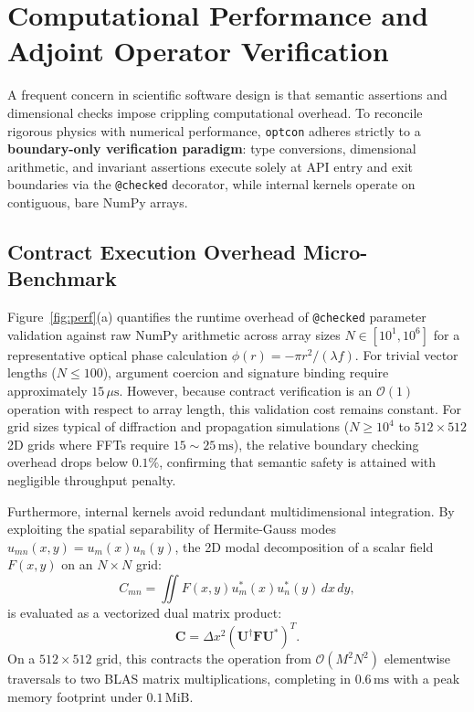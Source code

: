 \documentclass[preprint,12pt]{elsarticle}
\begin{document}
\section{Computational Performance and Adjoint Operator Verification}
\label{sec:performance}

A frequent concern in scientific software design is that semantic assertions and dimensional checks impose crippling computational overhead. To reconcile rigorous physics with numerical performance, \texttt{optcon} adheres strictly to a \textbf{boundary-only verification paradigm}: type conversions, dimensional arithmetic, and invariant assertions execute solely at API entry and exit boundaries via the \texttt{@checked} decorator, while internal kernels operate on contiguous, bare NumPy arrays.

\subsection{Contract Execution Overhead Micro-Benchmark}

Figure~\ref{fig:perf}(a) quantifies the runtime overhead of \texttt{@checked} parameter validation against raw NumPy arithmetic across array sizes $N \in [10^1, 10^6]$ for a representative optical phase calculation $\phi(r) = -\pi r^2 / (\lambda f)$. For trivial vector lengths ($N \le 100$), argument coercion and signature binding require approximately $15\,\mu\mathrm{s}$. However, because contract verification is an $\mathcal{O}(1)$ operation with respect to array length, this validation cost remains constant. For grid sizes typical of diffraction and propagation simulations ($N \ge 10^4$ to $512 \times 512$ 2D grids where FFTs require $15\sim 25\,\mathrm{ms}$), the relative boundary checking overhead drops below $0.1\%$, confirming that semantic safety is attained with negligible throughput penalty.

Furthermore, internal kernels avoid redundant multidimensional integration. By exploiting the spatial separability of Hermite-Gauss modes $u_{mn}(x, y) = u_m(x) u_n(y)$, the 2D modal decomposition of a scalar field $F(x, y)$ on an $N \times N$ grid:
\begin{equation}
C_{mn} = \iint F(x, y) u_m^*(x) u_n^*(y) \, dx \, dy,
\end{equation}
is evaluated as a vectorized dual matrix product:
\begin{equation}
\mathbf{C} = \Delta x^2 \left( \mathbf{U}^\dagger \mathbf{F} \mathbf{U}^* \right)^T.
\end{equation}
On a $512 \times 512$ grid, this contracts the operation from $\mathcal{O}(M^2 N^2)$ elementwise traversals to two BLAS matrix multiplications, completing in $0.6\,\mathrm{ms}$ with a peak memory footprint under $0.1\,\mathrm{MiB}$.
\end{document}
